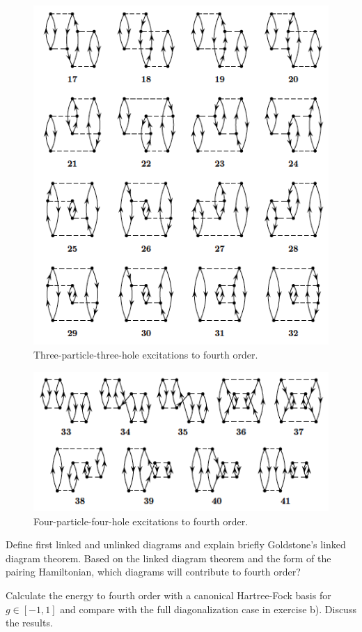 \documentclass[%
twoside,                 %
final,                   %
10pt]{article}
\newenvironment{doconceexercise}{}{}
\begin{document}
\begin{doconceexercise}
\begin{figure}[t]
  \centerline{\includegraphics[width=0.6\linewidth]{fig-proj/fourthorder3p3h.png}}
  \caption{
  Three-particle-three-hole excitations to fourth order. \label{fig:fourthorder3p3h}
  }
\end{figure}



\begin{figure}[t]
  \centerline{\includegraphics[width=0.6\linewidth]{fig-proj/fourthorder4p4h.png}}
  \caption{
  Four-particle-four-hole excitations to fourth order. \label{fig:fourthorder4p4h}
  }
\end{figure}


Define first linked and unlinked diagrams and explain briefly Goldstone's linked diagram theorem.
Based on the linked diagram theorem and the form of the pairing Hamiltonian, which diagrams will contribute
to fourth order? 

Calculate the energy to fourth order with a canonical Hartree-Fock basis for $g\in [-1,1]$ and compare
with the full diagonalization case in exercise b). Discuss the results.



\end{doconceexercise}
\end{document}
